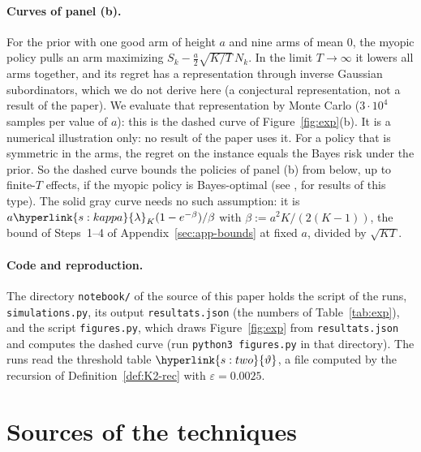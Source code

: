 \documentclass[11pt]{article}
\DeclareRobustCommand{\sy}[2]{{\hyperlink{#1}{#2}}}
\newcommand{\1}{\mathbf{1}}
\newcommand{\lamK}{\sy{s:kappa}{\lambda}}
\newcommand{\thr}{\sy{s:two}{\vartheta}}
\begin{document}
\paragraph{Curves of panel (b).} For the prior with one good arm of height $a$ and nine arms of mean $0$, the myopic policy pulls an arm maximizing
$S_k-\frac a2\sqrt{K/T}\,N_k$. In the limit $T\to\infty$ it lowers all arms together, and its regret has a representation through inverse Gaussian
subordinators, which we do not derive here (a conjectural representation, not a result of the paper). We evaluate that representation by Monte Carlo
($3\cdot10^4$ samples per value of $a$): this is the dashed curve of Figure~\ref{fig:exp}(b). It is a numerical illustration only: no result of the paper uses it. For a policy
that is symmetric in the arms, the regret on the instance equals the Bayes risk under the prior. So the dashed curve bounds the policies of panel (b) from below, up to
finite-$T$ effects, if the myopic policy is Bayes-optimal (see \citealp{Rod78}, for results of this type). The solid gray curve needs no such
assumption: it is $a\lamK_K(1-e^{-\beta})/\beta$ with $\beta:=a^2K/(2(K-1))$, the bound of Steps~1--4 of Appendix~\ref{sec:app-bounds} at fixed $a$, divided by $\sqrt{KT}$.

\paragraph{Code and reproduction.} The directory \texttt{notebook/} of the source of this paper holds the script of the runs, \texttt{simulations.py}, its
output \texttt{resultats.json} (the numbers of Table~\ref{tab:exp}), and the script \texttt{figures.py}, which draws Figure~\ref{fig:exp} from
\texttt{resultats.json} and computes the dashed curve (run \texttt{python3 figures.py} in that directory). The runs read the threshold table $\thr$, a file
computed by the recursion of Definition~\ref{def:K2-rec} with $\varepsilon=0.0025$.


\section{Sources of the techniques}\label{sec:attribution}
\end{document}
